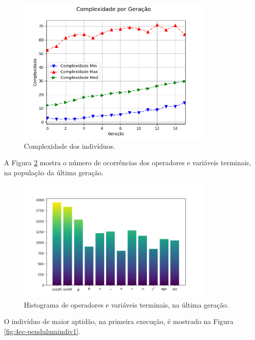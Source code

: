 \begin{figure}[H]
	\centering
	\includegraphics[width=0.85\textwidth]{02_desenvolvimento/04_EC_Fig_PendulumCompl.png}
	\caption{Complexidade dos indivíduos.}
	\label{fig:4ec-pendulumcompl}
\end{figure}

A Figura \ref{fig:4ec-pendulumoper} mostra o número de ocorrências dos operadores e variáveis terminais, na população da última geração.

\begin{figure}[H]
	\centering
	\includegraphics[width=0.85\textwidth]{02_desenvolvimento/04_EC_Fig_PendulumOper.png}
	\caption{Histograma de operadores e variáveis terminais, na última geração.}
	\label{fig:4ec-pendulumoper}
\end{figure}

O indivíduo de maior aptidão, na primeira execução, é mostrado na Figura \ref{fig:4ec-pendulumindiv1}.

